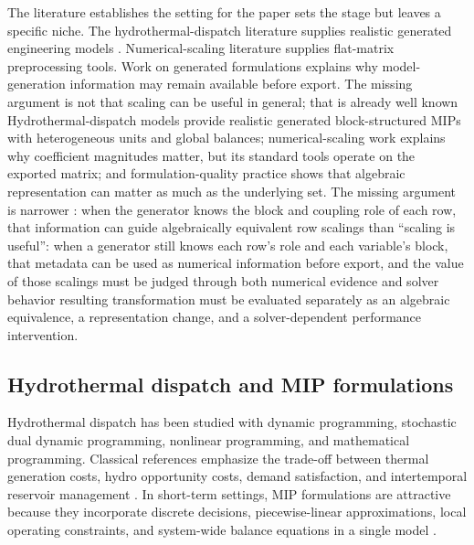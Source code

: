 \documentclass[AMA,Times1COL]{WileyNJDv5} %
\providecommand{\DIFadd}[1]{{\protect\color{blue} \sf #1}} %
\providecommand{\DIFdel}[1]{{\protect\color{red} \scriptsize #1}} %
\providecommand{\DIFaddbegin}{} %
\providecommand{\DIFaddend}{} %
\providecommand{\DIFdelbegin}{} %
\providecommand{\DIFdelend}{} %
\begin{document}
The literature \DIFdelbegin \DIFdel{establishes the setting for the paper }\DIFdelend \DIFaddbegin \DIFadd{sets the stage }\DIFaddend but leaves a specific niche. \DIFdelbegin \DIFdel{The hydrothermal-dispatch literature supplies realistic generated engineering models . Numerical-scaling literature supplies flat-matrix preprocessing tools. Work on generated formulations explains why model-generation information may remain available before export. The missing argument is not that scaling can be useful in general; that is already well known}\DIFdelend \DIFaddbegin \DIFadd{Hydrothermal-dispatch models provide realistic generated block-structured MIPs with heterogeneous units and global balances; numerical-scaling work explains why coefficient magnitudes matter, but its standard tools operate on the exported matrix; and formulation-quality practice shows that algebraic representation can matter as much as the underlying set}\DIFaddend . The missing argument is narrower \DIFdelbegin \DIFdel{: when the generator knows the block and coupling role of each row, that information can guide algebraically equivalent row scalings}\DIFdelend \DIFaddbegin \DIFadd{than ``scaling is useful'': when a generator still knows each row's role and each variable's block, that metadata can be used as numerical information before export}\DIFaddend , and the \DIFdelbegin \DIFdel{value of those scalings must be judged through both numerical evidence and solver behavior}\DIFdelend \DIFaddbegin \DIFadd{resulting transformation must be evaluated separately as an algebraic equivalence, a representation change, and a solver-dependent performance intervention}\DIFaddend .

\subsection{Hydrothermal dispatch and MIP formulations}

Hydrothermal dispatch has been studied with dynamic programming, stochastic dual
dynamic programming, nonlinear programming, and mathematical programming. Classical
references emphasize the trade-off between thermal generation costs, hydro opportunity
costs, demand satisfaction, and intertemporal reservoir management
\DIFdelbegin \DIFdel{\citep{wood2013power,conejo2010decision}}\DIFdelend \DIFaddbegin \DIFadd{\cite{wood2013power,conejo2010decision}}\DIFaddend . In short-term settings, MIP formulations are
attractive because they incorporate discrete decisions, piecewise-linear approximations,
local operating constraints, and system-wide balance equations in a single model
\DIFdelbegin \DIFdel{\citep{vielma2015formulation}}\DIFdelend \DIFaddbegin \DIFadd{\cite{vielma2015formulation}}\DIFaddend .
\end{document}
